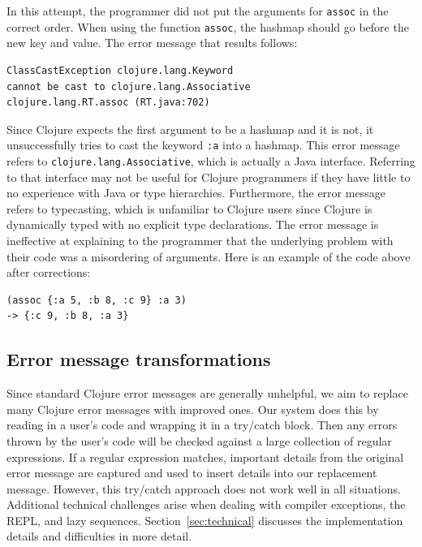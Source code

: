 \documentclass[12pt]{article}
\newcommand{\comment}[1]{{\bf \tt  {#1}}}
\newcommand{\emcomment}[1]{\textcolor{ForestGreen}{\comment{Elena: {#1}}}}
\begin{document}
In this attempt, the programmer did not put the arguments for \texttt{assoc} in the correct order.
When using the function \texttt{assoc}, the hashmap should go before the new key and value.
The error message that results follows:

\begin{verbatim}
ClassCastException clojure.lang.Keyword 
cannot be cast to clojure.lang.Associative
clojure.lang.RT.assoc (RT.java:702)
\end{verbatim}

Since Clojure expects the first argument to be a hashmap and it is not, it unsuccessfully tries to cast the keyword \texttt{:a} into a hashmap.
This error message refers to \texttt{clojure.lang.Associative}, which is actually a Java interface.
Referring to that interface may not be useful for Clojure programmers if they have little to no experience with Java or type hierarchies.
Furthermore, the error message refers to typecasting, which is unfamiliar to Clojure users since Clojure is dynamically typed with no explicit type declarations.
The error message is ineffective at explaining to the programmer that the underlying problem with their code was a misordering of arguments.
Here is an example of the code above after corrections:
 
\begin{verbatim}
(assoc {:a 5, :b 8, :c 9} :a 3)
-> {:c 9, :b 8, :a 3}
\end{verbatim}


\subsection{Error message transformations}\label{sec:transform}

Since standard Clojure error messages are generally unhelpful, we aim to replace many Clojure error messages with improved ones.
Our system does this by reading in a user's code and wrapping it in a try/catch block.
Then any errors thrown by the user's code will be checked against a large collection of regular expressions.
If a regular expression matches, important details from the original error message are captured and used to insert details into our replacement message.
However, this try/catch approach does not work well in all situations.
Additional technical challenges arise when dealing with compiler exceptions, the REPL, and lazy sequences.
Section~\ref{sec:technical} discusses the implementation details and difficulties in more detail.
\end{document}
